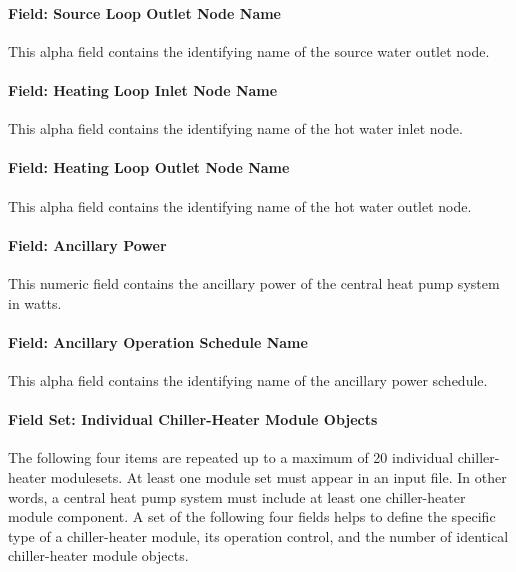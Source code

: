 \paragraph{Field: Source Loop Outlet Node Name}\label{field-source-loop-outlet-node-name}

This alpha field contains the identifying name of the source water outlet node.

\paragraph{Field: Heating Loop Inlet Node Name}\label{field-heating-loop-inlet-node-name}

This alpha field contains the identifying name of the hot water inlet node.

\paragraph{Field: Heating Loop Outlet Node Name}\label{field-heating-loop-outlet-node-name}

This alpha field contains the identifying name of the hot water outlet node.

\paragraph{Field: Ancillary Power}\label{field-ancillary-power-000}

This numeric field contains the ancillary power of the central heat pump system in watts.

\paragraph{Field: Ancillary Operation Schedule Name}\label{field-ancillary-operation-schedule-name}

This alpha field contains the identifying name of the ancillary power schedule.

\paragraph{Field Set: Individual Chiller-Heater Module Objects}\label{field-set-individual-chiller-heater-module-objects}

The following four items are repeated up to a maximum of 20 individual chiller-heater modulesets. At least one module set must appear in an input file. In other words, a central heat pump system must include at least one chiller-heater module component. A set of the following four fields helps to define the specific type of a chiller-heater module, its operation control, and the number of identical chiller-heater module objects.

